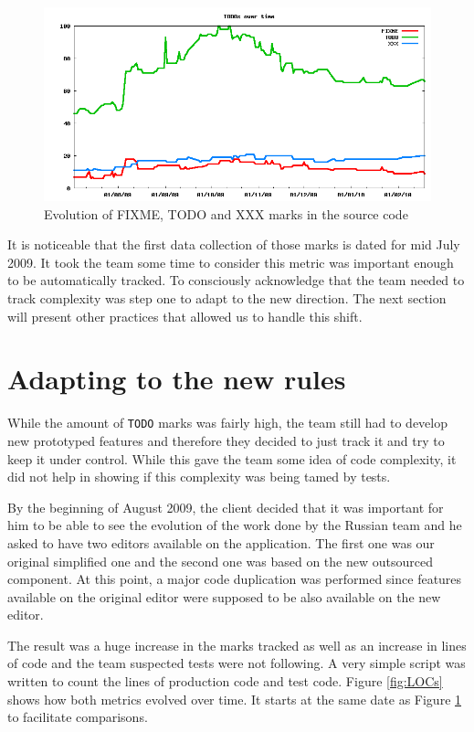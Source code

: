 \documentclass[lnbip]{svmultln}
\begin{document}
\begin{figure}[hbt]
  \centerline{
    \includegraphics[width=120mm]{TODOs.png}
  }
  \caption{Evolution of FIXME, TODO and XXX marks in the source code}
  \label{fig:TODOs}
\end{figure}

It is noticeable that the first data collection of those marks is
dated for mid July 2009. It took the team some time to consider this
metric was important enough to be automatically tracked. To
consciously acknowledge that the team needed to track complexity was
step one to adapt to the new direction. The next section will present
other practices that allowed us to handle this shift.

\section{Adapting to the new rules}
\label{sec:adapting}

While the amount of \texttt{TODO} marks was fairly high, the team
still had to develop new prototyped features and therefore they
decided to just track it and try to keep it under control. While this
gave the team some idea of code complexity, it did not help in showing
if this complexity was being tamed by tests.

By the beginning of August 2009, the client decided that it was
important for him to be able to see the evolution of the work done by
the Russian team and he asked to have two editors available on the
application. The first one was our original simplified one and the
second one was based on the new outsourced component. At this point, a
major code duplication was performed since features available on the
original editor were supposed to be also available on the new editor.

The result was a huge increase in the marks tracked as well as an
increase in lines of code and the team suspected tests were not
following. A very simple script was written to count the lines of
production code and test code. Figure \ref{fig:LOCs} shows how both
metrics evolved over time. It starts at the same date as Figure
\ref{fig:TODOs} to facilitate comparisons.
\end{document}
